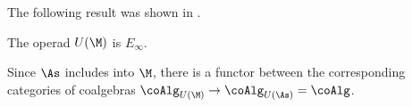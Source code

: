 The following result was shown in \cite{medina2020prop1}.

\begin{proposition}
	The operad $U(\M)$ is $E_\infty$.
\end{proposition}

Since $\As$ includes into $\M$, there is a functor between the corresponding categories of coalgebras $\coAlg_{U(\M)} \to \coAlg_{U(\As)} = \coAlg$.
